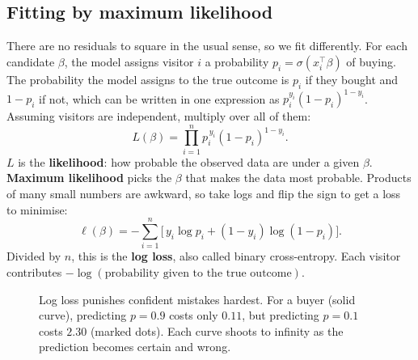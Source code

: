 \subsection{Fitting by maximum likelihood}

There are no residuals to square in the usual sense, so we fit differently. For each
candidate $\beta$, the model assigns visitor $i$ a probability $p_i = \sigma(x_i^\top\beta)$
of buying. The probability the model assigns to the true outcome is $p_i$
if they bought and $1 - p_i$ if not, which can be written in one expression as
$p_i^{y_i}(1-p_i)^{1-y_i}$. Assuming visitors are independent, multiply over all of them:
\[
  L(\beta) = \prod_{i=1}^n p_i^{\,y_i}(1-p_i)^{1-y_i}.
\]
$L$ is the \textbf{likelihood}: how probable the observed data are under a given
$\beta$. \textbf{Maximum likelihood} picks the $\beta$ that makes the data most probable.
Products of many small numbers are awkward, so take logs and flip the sign to get a loss
to minimise:
\[
  \ell(\beta) = -\sum_{i=1}^n \Big[\,y_i\log p_i + (1-y_i)\log(1-p_i)\Big].
\]
Divided by $n$, this is the \textbf{log loss}, also called binary cross-entropy. Each
visitor contributes $-\log(\text{probability given to the true outcome})$.

\begin{figure}[H]
\centering
{}
\caption{Log loss punishes confident mistakes hardest. For a buyer (solid curve), predicting
$p = 0.9$ costs only $0.11$, but predicting $p = 0.1$ costs $2.30$ (marked dots). Each
curve shoots to infinity as the prediction becomes certain and wrong.}
\label{fig:logit-logloss}
\end{figure}

